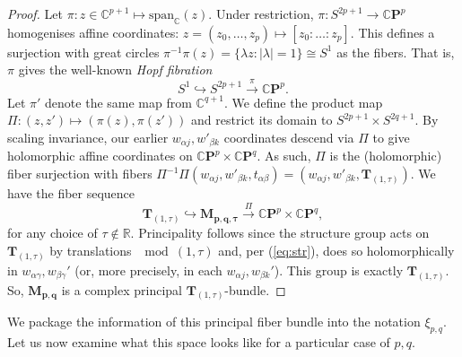 \begin{proof}

Let $\pi:z\in\mathbb{C}^{p+1} \mapsto \mathrm{span}_\mathbb{C}(z).$ Under restriction, $\pi: S^{2p+1} \rightarrow \mathbb{C}\mathbf{P}^p$ homogenises affine coordinates: $z=(z_0, \dots, z_p) \mapsto [z_0:\dots:z_p].$ This defines a surjection with great circles $\pi^{-1}\pi(z) = \{\lambda z:|\lambda| =1\}\cong S^1$ as the fibers. That is, $\pi$ gives the well-known \textit{Hopf fibration}
\[
S^1 \hookrightarrow S^{2p+1} \xrightarrow{\pi} \mathbb{C}\mathbf{P}^p.
\]
Let $\pi'$ denote the same map from $\mathbb{C}^{q+1}.$ We define the product map $\Pi: (z,z') \mapsto (\pi(z), \pi(z'))$ and restrict its domain to $S^{2p+1} \times S^{2q+1}.$ By scaling invariance, our earlier $w_{\alpha j}, w'_{\beta k}$ coordinates descend via $\Pi$ to give holomorphic affine coordinates on $\mathbb{C}\mathbf{P}^p\times \mathbb{C}\mathbf{P}^q.$ As such, $\Pi$ is the (holomorphic) fiber surjection with fibers $\Pi^{-1} \Pi (w_{\alpha j}, w'_{\beta k} , t_{\alpha \beta}) = (w_{\alpha j}, w'_{\beta k} , \mathbf{T}_{(1,\tau)}).$ We have the fiber sequence
    \[
    \mathbf{T}_{(1,\tau)} \hookrightarrow \mathbf{M_{p,q,\tau}} \xrightarrow{\Pi} \mathbb{C}\mathbf{P}^p \times \mathbb{C}\mathbf{P}^q,
    \]
for any choice of $\tau \notin \mathbb{R}.$ Principality follows since the structure group acts on $\mathbf{T}_{(1,\tau)}$ by translations $\mod (1,\tau)$ and, per (\ref{eq:str}), does so holomorphically in $w_{\alpha \gamma}, w_{\beta\gamma}'$ (or, more precisely, in each $w_{\alpha j}, w_{\beta k}'$). This group is exactly $\mathbf{T}_{(1,\tau)}.$ So, $\mathbf{M_{p,q}}$ is a complex principal $\mathbf{T}_{(1,\tau)}$-bundle.

\end{proof}

We package the information of this principal fiber bundle into the notation $\xi_{p,q}.$ Let us now examine what this space looks like for a particular case of $p,q.$

